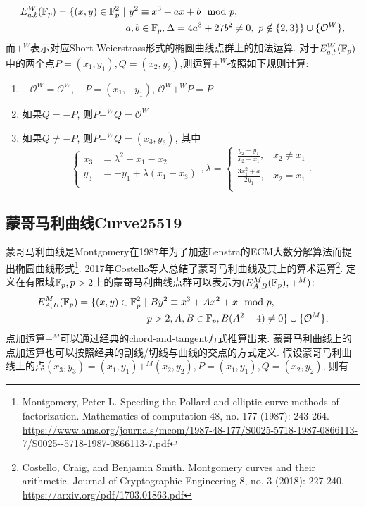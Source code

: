 \begin{equation*}
\begin{split}
E_{a,b}^{W}(\mathbb{F}_p)= \{(x,y)\in \mathbb{F}_p^2\ | & \ y^2 \equiv x^3 + ax + b \mod p, \\
 & a, b \in \mathbb{F}_p, \Delta = 4a^3 + 27b^2 \neq 0, \ p \notin \{2,3\}\} \cup \{\mathcal{O}^W\},
\end{split}
\end{equation*}
而$+^W$表示对应Short Weierstrass形式的椭圆曲线点群上的加法运算.
对于$E_{a,b}^{W}(\mathbb{F}_p)$中的两个点$P=(x_1,y_1), Q = (x_2, y_2)$,则运算$+^W$按照如下规则计算:
\begin{enumerate}
\item $-\mathcal{O}^W = \mathcal{O}^W$, $-P = (x_ 1, -y_1)$, $\mathcal{O}^W +^W P = P$
\item 如果$Q = -P$, 则$P +^W Q=\mathcal{O}^W$
\item 如果$Q\neq -P$, 则$P +^W Q=(x_3,y_3)$, 其中
\begin{equation*}
\left\{
\begin{array}{ll}
x_3 &= \lambda^2 - x_1 - x_2 \\
y_3 & = -y_1 + \lambda(x_1-x_3) \\
\end{array},
\right.
\lambda = 
\left\{
\begin{array}{ll}
\frac{y_2-y_1}{x_2-x_1}, & x_2\neq x_1\\
\frac{3x_1^2+a}{2y_1}, & x_2 =  x_1\\
\end{array}.
\right.
\end{equation*}
\end{enumerate}


\subsection{蒙哥马利曲线Curve25519}

蒙哥马利曲线是Montgomery在1987年为了加速Lenstra的ECM大数分解算法而提出椭圆曲线形式\footnote{
Montgomery, Peter L. Speeding the Pollard and elliptic curve methods of factorization.
Mathematics of computation 48, no. 177 (1987): 243-264. 
\url{https://www.ams.org/journals/mcom/1987-48-177/S0025-5718-1987-0866113-7/S0025--5718-1987-0866113-7.pdf}}.
2017年Costello等人总结了蒙哥马利曲线及其上的算术运算\footnote{
Costello, Craig, and Benjamin Smith. 
Montgomery curves and their arithmetic. 
Journal of Cryptographic Engineering 8, no. 3 (2018): 227-240.
\url{https://arxiv.org/pdf/1703.01863.pdf}}.
定义在有限域$\mathbb{F}_p, p>2$上的蒙哥马利曲线点群可以表示为$(E_{A,B}^M(\mathbb{F}_p), +^M)$:
\begin{equation*}
\begin{split}
E_{A,B}^M(\mathbb{F}_p) = \{(x,y)\in\mathbb{F}_p^2\  | &\  B y^2 \equiv x^3 + A x^2 + x\mod p, \\
& p >2, A, B \in \mathbb{F}_p, B(A^2-4)\neq 0 \} \cup \{\mathcal{O}^M\},
\end{split}
\end{equation*}
点加运算$+^M$可以通过经典的chord-and-tangent方式推算出来.
蒙哥马利曲线上的点加运算也可以按照经典的割线/切线与曲线的交点的方式定义.
假设蒙哥马利曲线上的点$(x_3, y_3) = (x_1, y_1) +^M (x_2,y_2), P = (x_1, y_1), Q = (x_2, y_2)$, 则有

